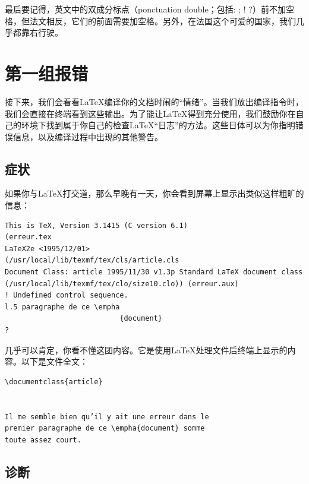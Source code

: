 最后要记得，英文中的双成分标点（ponctuation double；包括: ; ! ?）前不加空格，但法文相反，它们的前面需要加空格。另外，在法国这个可爱的国家，我们几乎都靠右行驶。

\section{第一组报错}

\begin{ii}
    接下来，我们会看看\LaTeX 编译你的文档时闹的“情绪”。当我们放出编译指令时，我们会直接在终端看到这些输出。为了能让\LaTeX 得到充分使用，我们鼓励你在自己的环境下找到属于你自己的检查\LaTeX “\textsf{日志}”的方法。这些日体可以为你指明错误信息，以及编译过程中出现的其他警告。
\end{ii}

\subsection{症状}

如果你与\LaTeX 打交道，那么早晚有一天，你会看到屏幕上显示出类似这样粗旷的信息：

\begin{dmd}
    \linenumbers
    \begin{verbatim}
This is TeX, Version 3.1415 (C version 6.1)
(erreur.tex
LaTeX2e <1995/12/01>
(/usr/local/lib/texmf/tex/cls/article.cls
Document Class: article 1995/11/30 v1.3p Standard LaTeX document class
(/usr/local/lib/texmf/tex/clo/size10.clo)) (erreur.aux)
! Undefined control sequence.
l.5 paragraphe de ce \empha
                           {document}
?\end{verbatim}
\end{dmd}

几乎可以肯定，你看不懂这团内容。它是使用\LaTeX 处理文件后终端上显示的内容。以下是文件全文：

\begin{dmd}
    \begin{verbatim}
\documentclass{article}


Il me semble bien qu’il y ait une erreur dans le
premier paragraphe de ce \empha{document} somme
toute assez court.

    \end{verbatim}
\end{dmd}

\subsection{诊断}

